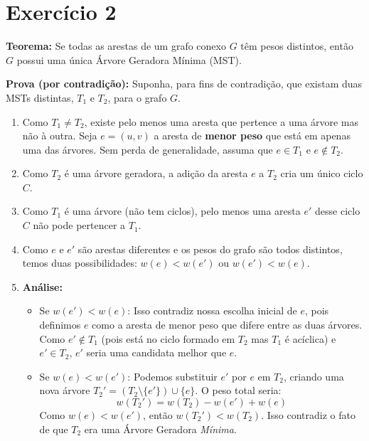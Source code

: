 \documentclass[a4paper,12pt]{article}
\begin{document}
\newpage
\section*{Exercício 2}

\textbf{Teorema:} Se todas as arestas de um grafo conexo $G$ têm pesos distintos, então $G$ possui uma única Árvore Geradora Mínima (MST).

\textbf{Prova (por contradição):}
Suponha, para fins de contradição, que existam duas MSTs distintas, $T_1$ e $T_2$, para o grafo $G$.

\begin{enumerate}
    \item Como $T_1 \neq T_2$, existe pelo menos uma aresta que pertence a uma árvore mas não à outra. Seja $e = (u, v)$ a aresta de \textbf{menor peso} que está em apenas uma das árvores. Sem perda de generalidade, assuma que $e \in T_1$ e $e \notin T_2$.
    
    \item Como $T_2$ é uma árvore geradora, a adição da aresta $e$ a $T_2$ cria um único ciclo $C$.
    
    \item Como $T_1$ é uma árvore (não tem ciclos), pelo menos uma aresta $e'$ desse ciclo $C$ não pode pertencer a $T_1$.
    
    \item Como $e$ e $e'$ são arestas diferentes e os pesos do grafo são todos distintos, temos duas possibilidades: $w(e) < w(e')$ ou $w(e') < w(e)$.
    
    \item \textbf{Análise:}
    \begin{itemize}
        \item Se $w(e') < w(e)$: Isso contradiz nossa escolha inicial de $e$, pois definimos $e$ como a aresta de menor peso que difere entre as duas árvores. Como $e' \notin T_1$ (pois está no ciclo formado em $T_2$ mas $T_1$ é acíclica) e $e' \in T_2$, $e'$ seria uma candidata melhor que $e$.
        \item Se $w(e) < w(e')$: Podemos substituir $e'$ por $e$ em $T_2$, criando uma nova árvore $T_2' = (T_2 \setminus \{e'\}) \cup \{e\}$. O peso total seria:
        $$w(T_2') = w(T_2) - w(e') + w(e)$$
        Como $w(e) < w(e')$, então $w(T_2') < w(T_2)$. Isso contradiz o fato de que $T_2$ era uma Árvore Geradora \textit{Mínima}.
    \end{itemize}
\end{enumerate}
\end{document}
